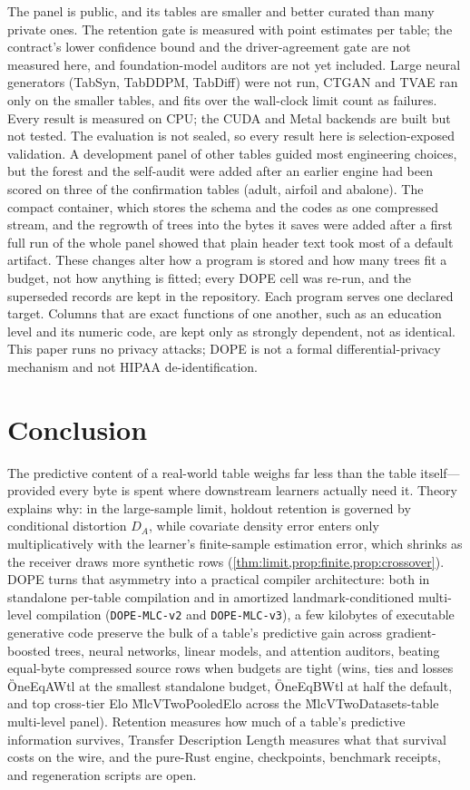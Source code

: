 The panel is public, and its tables are smaller and better curated than many private ones. The
retention gate is measured with point estimates per table; the contract's lower confidence bound and
the driver-agreement gate are not measured here, and foundation-model auditors are not yet included.
Large neural generators (TabSyn, TabDDPM, TabDiff) were not run, CTGAN and TVAE ran only on the
smaller tables, and fits over the wall-clock limit count as failures. Every result is measured on CPU;
the CUDA and Metal backends are built but not tested. The evaluation is not sealed, so every result
here is selection-exposed validation. A development panel of other tables guided most engineering
choices, but the forest and the self-audit were added after an earlier engine had been scored on three
of the confirmation tables (adult, airfoil and abalone). The compact container, which stores the schema
and the codes as one compressed stream, and the regrowth of trees into the bytes it saves were added
after a first full run of the whole panel showed that plain header text took most of a default
artifact. These changes alter how a program is stored and how many trees fit a budget, not how anything
is fitted; every DOPE cell was re-run, and the superseded records are kept in the repository. Each program serves one declared target. Columns that are exact functions of one
another, such as an education level and its numeric code, are kept only as strongly dependent, not as
identical. This paper runs no privacy attacks; DOPE is not a formal
differential-privacy mechanism and not HIPAA de-identification.

\section{Conclusion}

The predictive content of a real-world table weighs far less than the table itself---provided every
byte is spent where downstream learners actually need it. Theory explains why: in the large-sample
limit, holdout retention is governed by conditional distortion $D_A$, while covariate density error
enters only multiplicatively with the learner's finite-sample estimation error, which shrinks as the
receiver draws more synthetic rows (\cref{thm:limit,prop:finite,prop:crossover}). DOPE turns that
asymmetry into a practical compiler architecture: both in standalone per-table compilation and in
amortized landmark-conditioned multi-level compilation (\texttt{DOPE-MLC-v2} and \texttt{DOPE-MLC-v3}),
a few kilobytes of executable generative code preserve the bulk of a table's predictive gain across
gradient-boosted trees, neural networks, linear models, and attention auditors, beating equal-byte
compressed source rows when budgets are tight (wins, ties and losses \G{OneEqAWtl} at the smallest
standalone budget, \G{OneEqBWtl} at half the default, and top cross-tier Elo \G{MlcVTwoPooledElo} across
the \G{MlcVTwoDatasets}-table multi-level panel). Retention measures how much of a table's predictive
information survives, Transfer Description Length measures what that survival costs on the wire, and
the pure-Rust engine, checkpoints, benchmark receipts, and regeneration scripts are open.

